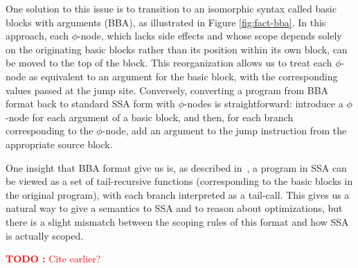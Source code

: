 \documentclass[acmsmall,screen,review]{acmart}
\newcounter{todos}
\newcommand{\TODO}[1]{{
  \stepcounter{todos}
  \begin{center}\large{\textcolor{red}{\textbf{TODO \arabic{todos}:} #1}}\end{center}
}}
\begin{document}
One solution to this issue is to transition to an isomorphic syntax called basic
blocks with arguments (BBA), as illustrated in Figure \ref{fig:fact-bba}. In this
approach, each $\phi$-node, which lacks side effects and whose scope depends
solely on the originating basic blocks rather than its position within its own
block, can be moved to the top of the block. This reorganization allows us to
treat each $\phi$-node as equivalent to an argument for the basic block, with
the corresponding values passed at the jump site. Conversely, converting a
program from BBA format back to standard SSA form with $\phi$-nodes is
straightforward: introduce a $\phi$-node for each argument of a basic block, and
then, for each branch corresponding to the $\phi$-node, add an argument to the
jump instruction from the appropriate source block. 

One insight that BBA format give us is, as described in~\citet{appel-ssa}, a
program in SSA can be viewed as a set of tail-recursive functions (corresponding
to the basic blocks in the original program), with each branch interpreted as a
tail-call. This gives us a natural way to give a semantics to SSA and to reason
about optimizations, but there is a slight mismatch between the scoping rules of
this format and how SSA is actually scoped.

\TODO{Cite \citet{kelsey-95-cps} earlier?}
\end{document}
